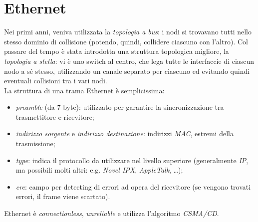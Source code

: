 \section{Ethernet}
Nei primi anni, veniva utilizzata la \textit{topologia a bus}: i nodi si trovavano tutti nello stesso dominio di collisione (potendo, quindi, collidere ciascuno con l'altro). Col passare del tempo è stata introdotta una struttura topologica migliore, la \textit{topologia a stella}: vi è uno switch al centro, che lega tutte le interfaccie di ciascun nodo a sé stesso, utilizzando un canale separato per ciascuno ed evitando quindi eventuali collisioni tra i vari nodi. \\
La struttura di una trama Ethernet è semplicissima:
\begin{itemize}
	\item \textit{preamble} (da 7 byte): utilizzato per garantire la sincronizzazione tra trasmettitore e ricevitore;
	\item \textit{indirizzo sorgente} e \textit{indirizzo destinazione}: indirizzi \textit{MAC}, estremi della trasmissione;
	\item \textit{type}: indica il protocollo da utilizzare nel livello superiore (generalmente \textit{IP}, ma possibili molti altri: e.g. \textit{Novel IPX}, \textit{AppleTalk}, \ldots);
	\item \textit{crc}: campo per detecting di errori ad opera del ricevitore (se vengono trovati errori, il frame viene scartato).
\end{itemize}
Ethernet è \textit{connectionless}, \textit{unreliable} e utilizza l'algoritmo \textit{CSMA/CD}.
\newpage
